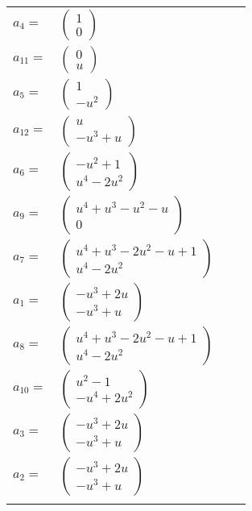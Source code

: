 \documentclass[1p]{elsarticle_modified}
\theoremstyle{definition}
\begin{document}
\begin{tabular}{m{7pt} m{180pt} m{7pt} m{180pt} }
\flushright $a_{4}=$&$\begin{pmatrix}1\\0\end{pmatrix}$ \\
\flushright $a_{11}=$&$\begin{pmatrix}0\\u\end{pmatrix}$ \\
\flushright $a_{5}=$&$\begin{pmatrix}1\\- u^2\end{pmatrix}$ \\
\flushright $a_{12}=$&$\begin{pmatrix}u\\- u^3+u\end{pmatrix}$ \\
\flushright $a_{6}=$&$\begin{pmatrix}- u^2+1\\u^4-2 u^2\end{pmatrix}$ \\
\flushright $a_{9}=$&$\begin{pmatrix}u^4+u^3- u^2- u\\0\end{pmatrix}$ \\
\flushright $a_{7}=$&$\begin{pmatrix}u^4+u^3-2 u^2- u+1\\u^4-2 u^2\end{pmatrix}$ \\
\flushright $a_{1}=$&$\begin{pmatrix}- u^3+2 u\\- u^3+u\end{pmatrix}$ \\
\flushright $a_{8}=$&$\begin{pmatrix}u^4+u^3-2 u^2- u+1\\u^4-2 u^2\end{pmatrix}$ \\
\flushright $a_{10}=$&$\begin{pmatrix}u^2-1\\- u^4+2 u^2\end{pmatrix}$ \\
\flushright $a_{3}=$&$\begin{pmatrix}- u^3+2 u\\- u^3+u\end{pmatrix}$ \\
\flushright $a_{2}=$&$\begin{pmatrix}- u^3+2 u\\- u^3+u\end{pmatrix}$\\&\end{tabular}
\end{document}
